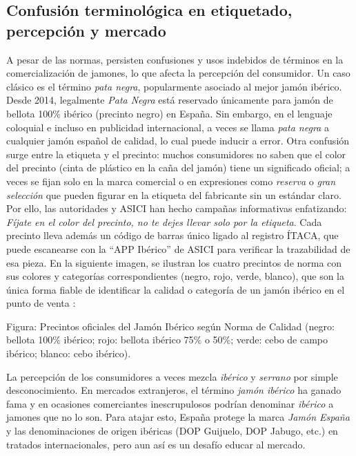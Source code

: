 \subsection{Confusión terminológica en etiquetado, percepción y mercado}
A pesar de las normas, persisten confusiones y usos indebidos de términos en la comercialización de jamones, lo que afecta la percepción del consumidor. Un caso clásico es el término \textit{pata negra}, popularmente asociado al mejor jamón ibérico. Desde 2014, legalmente \textit{Pata Negra} está reservado únicamente para jamón de bellota 100\% ibérico (precinto negro) en España. Sin embargo, en el lenguaje coloquial e incluso en publicidad internacional, a veces se llama \textit{pata negra} a cualquier jamón español de calidad, lo cual puede inducir a error. Otra confusión surge entre la etiqueta y el precinto: muchos consumidores no saben que el color del precinto (cinta de plástico en la caña del jamón) tiene un significado oficial; a veces se fijan solo en la marca comercial o en expresiones como \textit{reserva} o \textit{gran selección} que pueden figurar en la etiqueta del fabricante sin un estándar claro. Por ello, las autoridades y ASICI han hecho campañas informativas enfatizando: \textit{Fíjate en el color del precinto, no te dejes llevar solo por la etiqueta}\cite{noauthor_consumo_2022}. Cada precinto lleva además un código de barras único ligado al registro ÍTACA, que puede escanearse con la “APP Ibérico” de ASICI para verificar la trazabilidad de esa pieza. En la siguiente imagen, se ilustran los cuatro precintos de norma con sus colores y categorías correspondientes (negro, rojo, verde, blanco), que son la única forma fiable de identificar la calidad o categoría de un jamón ibérico en el punto de venta \cite{noauthor_precintos_nodate}:

Figura: Precintos oficiales del Jamón Ibérico según Norma de Calidad (negro: bellota 100\% ibérico; rojo: bellota ibérico 75\% o 50\%; verde: cebo de campo ibérico; blanco: cebo ibérico).

La percepción de los consumidores a veces mezcla \textit{ibérico} y \textit{serrano} por simple desconocimiento. En mercados extranjeros, el término \textit{jamón ibérico} ha ganado fama y en ocasiones comerciantes inescrupulosos podrían denominar \textit{ibérico} a jamones que no lo son. Para atajar esto, España protege la marca \textit{Jamón España} y las denominaciones de origen ibéricas (DOP Guijuelo, DOP Jabugo, etc.) en tratados internacionales, pero aun así es un desafío educar al mercado.

